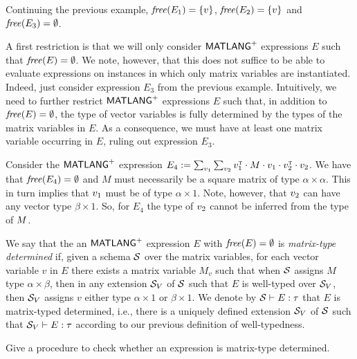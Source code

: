 \begin{example}
Continuing the previous example, $\operatorname{\mathit{free}}(E_1)=\{v\}$, $\operatorname{\mathit{free}}(E_2)=\{v\}$ and 
$\operatorname{\mathit{free}}(E_3)=\emptyset$.
\end{example}

A first restriction is that we will only consider $\mathsf{MATLANG}^{\sf +}$ expressions $E$ such that $\operatorname{\mathit{free}}(E)=\emptyset$.
We note, however, that this does not suffice to be able to evaluate expressions on instances in which only
matrix variables are instantiated. Indeed, just consider expression $E_3$ from the previous example.
Intuitively, we need to further restrict $\mathsf{MATLANG}^{\sf +}$ expressions $E$ such that, in addition to $\operatorname{\mathit{free}}(E)=\emptyset$,
the type of vector variables is fully determined by the types of the matrix variables in $E$. 
As a consequence,
we must have at least one matrix variable occurring in $E$, ruling out expression $E_3$. 

\begin{example}
Consider  the $\mathsf{MATLANG}^{\sf +}$ expression $E_4:=\sum_{v_1}\sum_{v_2} v_1^{\textsc{t}}\cdot M\cdot v_1\cdot v_2^{\textsc{t}}\cdot v_2$.
We have that $\operatorname{\mathit{free}}(E_4)=\emptyset$ and $M$ must necessarily be a square matrix of type $\alpha\times\alpha$. This in turn 
implies that $v_1$ must be  of type $\alpha\times 1$. Note, however, that $v_2$ can have any vector type $\beta\times 1$. So, for $E_4$ the type of $v_2$ cannot be inferred from 
the type of $M$.
\end{example}

We say that the an $\mathsf{MATLANG}^{\sf +}$ expression $E$ with $\operatorname{\mathit{free}}(E)=\emptyset$ is \textit{matrix-type determined}
if, given a schema $\mathcal{S}$ over the matrix variables, for each vector variable $v$ in $E$ 
there exists a matrix variable $M_v$ such that when $\mathcal{S}$ assigns $M$ type $\alpha\times\beta$,
then in any extension $\mathcal{S}_V$ of $\mathcal{S}$ such that $E$ is well-typed over $\mathcal{S}_V$, then
$\mathcal{S}_V$ assigns $v$  either type $\alpha\times 1$ or $\beta\times 1$. We denote by $\mathcal{S}\vdash E:\tau$ that $E$
is matrix-typed determined, i.e., there is a uniquely defined extension $\mathcal{S}_V$ of $\mathcal{S}$ such that $\mathcal{S}_V\vdash E:\tau$
according to our previous definition of well-typedness.


\begin{todo}
Give a procedure to check whether an expression is matrix-type determined.
\end{todo}
%



